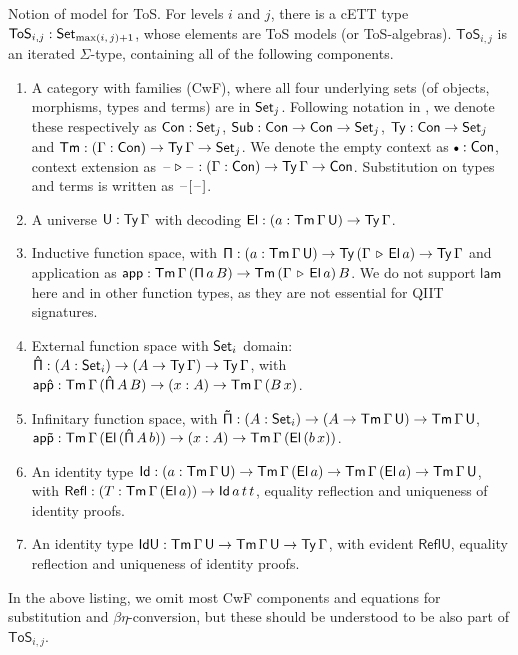 \documentclass{llncs}
\newcommand{\ToS}{\mathsf{ToS}}
\newcommand{\ext}{\triangleright}
\newcommand{\emptycon}{\scaleobj{.75}\bullet}
\newcommand{\Pii}{\mathsf{\Pi}}
\newcommand{\appi}{\mathsf{app}}
\newcommand{\lami}{\mathsf{lam}}
\newcommand{\Pie}{\mathsf{\hat{\Pi}}}
\newcommand{\appe}{\mathsf{ap\hat{p}}}
\newcommand{\Piinf}{\mathsf{\tilde{\Pi}}}
\newcommand{\appinf}{\mathsf{ap\tilde{p}}}
\newcommand{\Refl}{\mathsf{Refl}}
\newcommand{\IdU}{\mathsf{IdU}}
\newcommand{\ReflU}{\mathsf{ReflU}}
\begin{document}
\begin{nidefinition}{Notion of model for ToS.}\label{def:tos}
For levels $i$ and $j$, there is a cETT type $\ToS_{i,j} : \Set_{\max(i,\,j)+1}$, whose elements are
ToS models (or ToS-algebras). $\ToS_{i,j}$ is an iterated $\Sigma$-type, containing
all of the following components.
\begin{enumerate}
\item
  A category with families (CwF), where all four underlying sets (of
  objects, morphisms, types and terms) are in $\mathsf{Set}_j$. Following notation in
  \cite{TODO}, we denote these respectively as $\mathsf{Con} : \mathsf{Set}_j$, $\mathsf{Sub} : \mathsf{Con} \rightarrow
  \mathsf{Con} \rightarrow \mathsf{Set}_j$, $\mathsf{Ty} : \mathsf{Con} \rightarrow \mathsf{Set}_j$ and $\mathsf{Tm} : (\Gamma : \mathsf{Con}) \rightarrow
  \mathsf{Ty}\,\Gamma \rightarrow \mathsf{Set}_j$. We denote the empty context as $\emptycon : \Con$,
  context extension as $\blank\ext\blank : (\Gamma : \Con)\ra \Ty\,\Gamma \ra \Con$.
  Substitution on types and terms is written as $\mathord{\hspace{1pt}\text{--}\hspace{1pt}}[\mathord{\hspace{1pt}\text{--}\hspace{1pt}}]$.
\item
  A universe $\mathsf{U} : \mathsf{Ty}\,\Gamma$ with decoding $\mathsf{El} : (a : \mathsf{Tm}\,\Gamma\,\mathsf{U}) \rightarrow
  \mathsf{Ty}\,\Gamma$.
\item
  Inductive function space, with $\Pii : (a : \Tm\,\Gamma\,\U) \ra
  \Ty\,(\Gamma\,\ext\,\El\,a) \ra \Ty\,\Gamma$ and application as $\appi :
  \Tm\,\Gamma\,(\Pii\,a\,B)\ra \Tm\,(\Gamma\,\ext\,\El\,a)\,B$. We do not
  support $\lami$ here and in other function types, as they are not essential
  for QIIT signatures.
\item
  External function space with $\mathsf{Set}_i$ domain: $\Pie : (A : \Set_i)\ra(A \ra
  \Ty\,\Gamma)\ra \Ty\,\Gamma$, with $\appe : \Tm\,\Gamma\,(\Pie\,A\,B)\ra(x :
  A)\ra \Tm\,\Gamma\,(B\,x)$.
\item
  Infinitary function space, with $\Piinf : (A : \Set_i)\ra(A \ra
  \Tm\,\Gamma\,\U)\ra \Tm\,\Gamma\,\U$, $\appinf :
  \Tm\,\Gamma\,(\El\,(\Pie\,A\,b))\ra(x : A)\ra \Tm\,\Gamma\,(\El\,(b\,x))$.
\item
  An identity type $\mathsf{Id} : (a : \mathsf{Tm}\,\Gamma\,\mathsf{U})\rightarrow
  \mathsf{Tm}\,\Gamma\,(\mathsf{El}\,a)\rightarrow\mathsf{Tm}\,\Gamma\,(\mathsf{El}\,a)\rightarrow \mathsf{Tm}\,\Gamma\,\mathsf{U}$, with
  $\Refl : (T : \Tm\,\Gamma\,(\El\,a))\ra \Id\,a\,t\,t$, equality reflection
  and uniqueness of identity proofs.
\item
  An identity type $\IdU : \Tm\,\Gamma\,\U \ra \Tm\,\Gamma\,\U \ra \Ty\,\Gamma$, with
  evident $\ReflU$, equality reflection and uniqueness of identity proofs.
\end{enumerate}
\end{nidefinition}
In the above listing, we omit most CwF components and equations for substitution and
$\beta\eta$-conversion, but these should be understood to be also part of $\ToS_{i,j}$.
\end{document}
